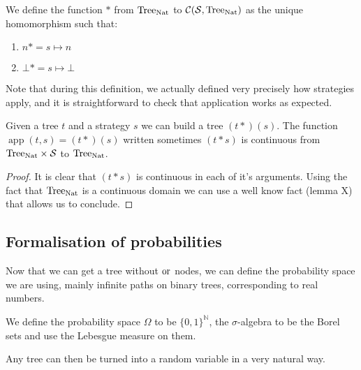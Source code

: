 \begin{ensps}
\begin{adefinition}
    We define the function $*$ from $\textnormal{Tree}_{\textnormal{Nat}}$ to $\mathcal{C}(\mathcal{S},\textnormal{Tree}_{\textnormal{Nat}})$
    as the unique homomorphism such that:

    \begin{enumerate}
        \item $n* = s \mapsto n$
        \item $\bot* = s \mapsto \bot$
    \end{enumerate}
\end{adefinition}

Note that during this definition, we actually defined very precisely 
how strategies apply, and it is straightforward to check that 
application works as expected.
\end{ensps}

\begin{alemma}[Continuity]
    Given a tree $t$ and a strategy $s$ we can 
    build a tree $(t*) (s)$. The function 
    $\operatorname{app}(t,s) = (t*)(s)$ written sometimes
    $(t*s)$ 
    is continuous 
    from $\textnormal{Tree}_{\textnormal{Nat}} \times \mathcal{S}$ to $\textnormal{Tree}_{\textnormal{Nat}}$.
\end{alemma}

\begin{ensps}
\begin{proof}
    It is clear that $(t*s)$ is continuous in each of it's 
    arguments. Using the fact that $\textnormal{Tree}_{\textnormal{Nat}}$ is a 
    continuous domain we can use a well know fact 
    \cite{proofAlex} (lemma X) that allows us to conclude.
\end{proof}
\end{ensps}


\subsection{Formalisation of probabilities}

Now that we can get a tree without $\operatorname{or}$ nodes,
we can define the probability space we are using, mainly 
infinite paths on binary trees, corresponding to real numbers.

\begin{adefinition}
    We define the probability space $\Omega$
    to be $\{0,1\}^\mathbb{N}$, the 
    $\sigma$-algebra to be the Borel sets 
    and use the Lebesgue measure on them.
\end{adefinition}

Any tree can then be turned into a random variable in 
a very natural way. 

